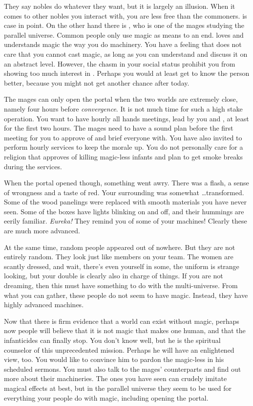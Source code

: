 \documentclass[char]{guildcamp3}
\begin{document}
They say nobles do whatever they want, but it is largely an illusion. When it comes to other nobles you interact with, you are less free than the commoners. \cNobleTwo{} is case in point. On the other hand there is \cMageOne{\intro}, who is one of the mages studying the parallel universe. Common people only use magic as means to an end. \cMageOne{} loves and understands magic the way you do machinery. You have a feeling that  does not care that you cannot cast magic, as long as you can understand and discuss it on an abstract level. However, the chasm in your social status prohibit you from showing too much interest in \cMageOne{}. Perhaps you would at least get to know the person better, because you might not get another chance after today.

The mages can only open the portal when the two worlds are extremely close, namely four hours before \emph{convergence}. It is not much time for such a high stake operation. You want to have hourly all hands meetings, lead by you and \cNobleOne{}, at least for the first two hours. The mages need to have a sound plan before the first meeting for you to approve of and brief everyone with. You have also invited \cPaladin{} to perform hourly services to keep the morale up. You do not personally care for a religion that approves of killing magic-less infants and plan to get smoke breaks during the services.

When the portal opened though, something went awry. There was a flash, a sense of wrongness and a taste of red. Your surrounding was somewhat \ldots transformed. Some of the wood panelings were replaced with smooth materials you have never seen. Some of the boxes have lights blinking on and off, and their hummings are eerily familiar. \emph{Eureka!} They remind you of some of your machines! Clearly these are much more advanced. 

At the same time, random people appeared out of nowhere. But they are not entirely random. They look just like members on your team. The women are scantly dressed, and wait, there's even yourself in some, the uniform is strange looking, but your double is clearly also in charge of things. If you are not dreaming, then this must have something to do with the multi-universe. From what you can gather, these people do not seem to have magic. Instead, they have highly advanced machines.

Now that there is firm evidence that a world can exist without magic, perhaps now people will believe that it is not magic that makes one human, and that the infanticides can finally stop. You don't know \cPaladin{} well, but he is the spiritual counselor of this unprecedented mission. Perhaps he will have an enlightened view, too. You would like to convince him to pardon the magic-less in his scheduled sermons. You must also talk to the mages' counterparts and find out more about their machineries. The ones you have seen can crudely imitate magical effects at best, but in the parallel universe they seem to be used for everything your people do with magic, including opening the portal. 
\end{document}
